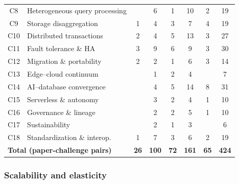 \documentclass[a4paper,fleqn]{cas-sc}
\begin{document}
\begin{landscape}
\begin{small}
\begin{longtable}{c >{\raggedright\arraybackslash}p{4.6cm} *{5}{c} c}
C8 & Heterogeneous query processing &   & \cellcolor{cgray!56}6 & \cellcolor{cgray!26}1 & \cellcolor{cgray!80}10 & \cellcolor{cgray!32}2 & 19 \\
C9 & Storage disaggregation & \cellcolor{cgray!28}1 & \cellcolor{cgray!54}4 & \cellcolor{cgray!45}3 & \cellcolor{cgray!80}7 & \cellcolor{cgray!54}4 & 19 \\
C10 & Distributed transactions & \cellcolor{cgray!29}2 & \cellcolor{cgray!38}4 & \cellcolor{cgray!43}5 & \cellcolor{cgray!80}13 & \cellcolor{cgray!33}3 & 27 \\
C11 & Fault tolerance \& HA & \cellcolor{cgray!40}3 & \cellcolor{cgray!80}9 & \cellcolor{cgray!60}6 & \cellcolor{cgray!80}9 & \cellcolor{cgray!40}3 & 30 \\
C12 & Migration \& portability & \cellcolor{cgray!40}2 & \cellcolor{cgray!40}2 & \cellcolor{cgray!30}1 & \cellcolor{cgray!80}6 & \cellcolor{cgray!50}3 & 14 \\
C13 & Edge--cloud continuum &   & \cellcolor{cgray!35}1 & \cellcolor{cgray!50}2 & \cellcolor{cgray!80}4 &   & 7 \\
C14 & AI--database convergence &   & \cellcolor{cgray!37}4 & \cellcolor{cgray!41}5 & \cellcolor{cgray!80}14 & \cellcolor{cgray!54}8 & 31 \\
C15 & Serverless \& autonomy &   & \cellcolor{cgray!65}3 & \cellcolor{cgray!50}2 & \cellcolor{cgray!80}4 & \cellcolor{cgray!35}1 & 10 \\
C16 & Governance \& lineage &   & \cellcolor{cgray!44}2 & \cellcolor{cgray!44}2 & \cellcolor{cgray!80}5 & \cellcolor{cgray!32}1 & 10 \\
C17 & Sustainability &   & \cellcolor{cgray!60}2 & \cellcolor{cgray!40}1 & \cellcolor{cgray!80}3 &   & 6 \\
C18 & Standardization \& interop. & \cellcolor{cgray!28}1 & \cellcolor{cgray!80}7 & \cellcolor{cgray!45}3 & \cellcolor{cgray!71}6 & \cellcolor{cgray!37}2 & 19 \\
\midrule
\multicolumn{2}{l}{\textbf{Total (paper-challenge pairs)}} & \textbf{26} & \textbf{100} & \textbf{72} & \textbf{161} & \textbf{65} & \textbf{424} \\
\end{longtable}
\end{small}
\end{landscape}

\subsubsection{Scalability and elasticity}
\label{subsubsec:scalability}
\end{document}

